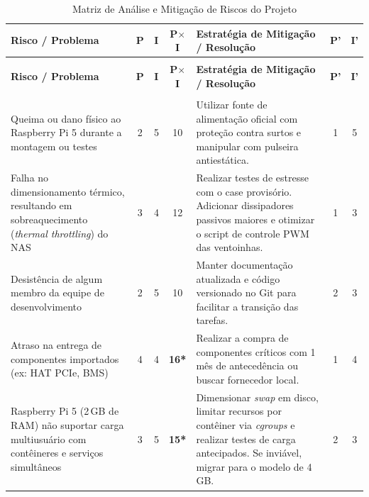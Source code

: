 \documentclass[a4paper,12pt]{article}
\begin{document}
\begin{xltabular}{\textwidth}{@{} >{\raggedright\arraybackslash}X c c c >{\raggedright\arraybackslash}X c c @{}}
    \caption{Matriz de Análise e Mitigação de Riscos do Projeto} \label{tab:analise_riscos} \\
    \toprule
    \textbf{Risco / Problema} & \textbf{P} & \textbf{I} & \textbf{P$\times$I} & \textbf{Estratégia de Mitigação / Resolução} & \textbf{P'} & \textbf{I'} \\
    \midrule
    \endfirsthead

     \\
    \toprule
    \textbf{Risco / Problema} & \textbf{P} & \textbf{I} & \textbf{P$\times$I} & \textbf{Estratégia de Mitigação / Resolução} & \textbf{P'} & \textbf{I'} \\
    \midrule
    \endhead

    \midrule
     \\
    \endfoot

    \bottomrule
    \endlastfoot

    Queima ou dano físico ao Raspberry Pi 5 durante a montagem ou testes & 2 & 5 & 10 & Utilizar fonte de alimentação oficial com proteção contra surtos e manipular com pulseira antiestática. & 1 & 5 \\

    Falha no dimensionamento térmico, resultando em sobreaquecimento (\textit{thermal throttling}) do NAS & 3 & 4 & 12 & Realizar testes de estresse com o case provisório. Adicionar dissipadores passivos maiores e otimizar o script de controle PWM das ventoinhas. & 1 & 3 \\

    Desistência de algum membro da equipe de desenvolvimento & 2 & 5 & 10 & Manter documentação atualizada e código versionado no Git para facilitar a transição das tarefas. & 2 & 3 \\

    Atraso na entrega de componentes importados (ex: HAT PCIe, BMS) & 4 & 4 & \textbf{16*} & Realizar a compra de componentes críticos com 1 mês de antecedência ou buscar fornecedor local. & 1 & 4 \\

    Raspberry Pi 5 (2\,GB de RAM) não suportar carga multiusuário com contêineres e serviços simultâneos & 3 & 5 & \textbf{15*} & Dimensionar \textit{swap} em disco, limitar recursos por contêiner via \textit{cgroups} e realizar testes de carga antecipados. Se inviável, migrar para o modelo de 4\,GB. & 2 & 3 \\


\end{xltabular}
\end{document}
